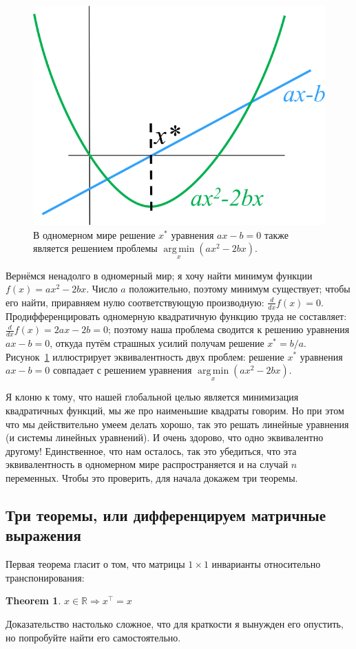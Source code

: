 \documentclass{article}
\DeclareMathOperator*{\argmin}{arg\,min}
\newtheorem{theorem}{Theorem}
\begin{document}
\begin{figure}[ht]
	\centering
	\includegraphics[width=.3\linewidth]{minpb1d}
	\caption{В одномерном мире решение $x^*$ уравнения $ax - b = 0$ также является решением проблемы $\argmin\limits_x(ax^2-2bx)$. }
	\label{fig:min1d}
\end{figure}

Вернёмся ненадолго в одномерный мир; я хочу найти минимум функции $f(x) = ax^2 - 2bx$. Число $a$ положительно, поэтому минимум существует; чтобы его найти, приравняем нулю соответствующую производную: $\frac{d}{dx}f(x) = 0$. Продифференцировать одномерную квадратичную функцию труда не составляет: $\frac{d}{dx}f(x) = 2ax - 2b = 0$; поэтому наша проблема сводится к решению уравнения $ax-b=0$, откуда
путём страшных усилий получам решение $x^* = b/a$. Рисунок~\ref{fig:min1d} иллюстрирует эквивалентность двух проблем: решение $x^*$ уравнения $ax-b=0$ совпадает с решением уравнения $\argmin\limits_x(ax^2 - 2bx)$.

Я клоню к тому, что нашей глобальной целью является минимизация квадратичных функций, мы же про наименьшие квадраты говорим. Но при этом что мы действительно умеем делать хорошо, так это решать линейные уравнения (и системы линейных уравнений). И очень здорово, что одно эквивалентно другому!
Единственное, что нам осталось, так это убедиться, что эта эквивалентность в одномерном мире распространяется и на случай $n$ переменных. Чтобы это проверить, для начала докажем три теоремы.

\subsection{Три теоремы, или дифференцируем матричные выражения}
Первая теорема гласит о том, что матрицы $1\times 1$ инварианты относительно транспонирования:
\begin{theorem}
$x\in \mathbb R \Rightarrow x^\top = x$
\end{theorem}
Доказательство настолько сложное, что для краткости я вынужден его опустить, но попробуйте найти его самостоятельно.
\end{document}
